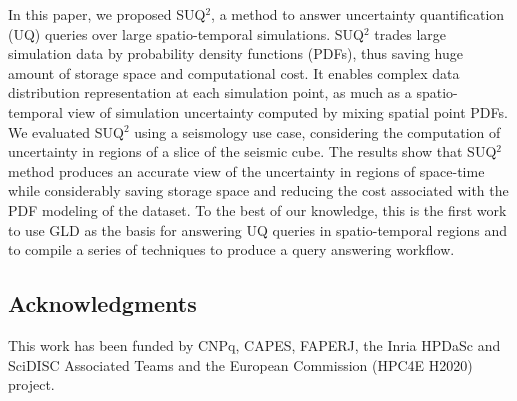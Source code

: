 \documentclass[11pt]{article}
\begin{document}
In this paper, we proposed SUQ$^2$, a method to answer uncertainty quantification (UQ) queries over large spatio-temporal simulations. SUQ$^2$ trades large simulation data by probability density functions (PDFs), thus saving huge amount of storage space and computational cost. It enables complex data distribution representation at each simulation point, as much as a  spatio-temporal view  of simulation uncertainty computed by mixing spatial point PDFs.
We evaluated SUQ$^2$ using a seismology use case, considering the computation of uncertainty in regions of a slice of the seismic cube. The results show that SUQ$^2$ method produces an accurate view of the uncertainty in regions of space-time while considerably saving storage space and reducing the cost associated with the PDF modeling of the dataset. To the best of our knowledge, this is the first work to use GLD as the basis for answering UQ queries in spatio-temporal regions and to compile a series of techniques to produce a query answering workflow.



\subsection*{Acknowledgments}
This work has been funded by CNPq, CAPES, FAPERJ, the Inria HPDaSc
and SciDISC Associated Teams and the European Commission (HPC4E H2020) project.
\end{document}
